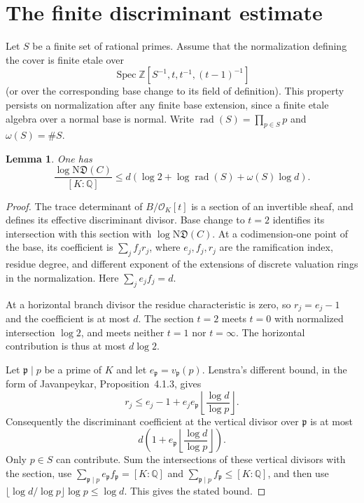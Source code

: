 \documentclass[11pt]{article}
\newtheorem{lemma}[theorem]{Lemma}
\newcommand{\Q}{\mathbb Q}
\newcommand{\Z}{\mathbb Z}
\newcommand{\OK}{\mathcal O_K}
\begin{document}
\section{The finite discriminant estimate}

Let $S$ be a finite set of rational primes. Assume that the
normalization defining the cover is finite etale over
\[
 \operatorname{Spec}\Z[S^{-1},t,t^{-1},(t-1)^{-1}]
\]
(or over the corresponding base change to its field of definition).
This property persists on normalization after any finite base
extension, since a finite etale algebra over a normal base is normal.
Write $\operatorname{rad}(S)=\prod_{p\in S}p$ and $\omega(S)=\#S$.

\begin{lemma}\label{lem:discriminant}
One has
\[
 \frac{\log\mathrm N\mathfrak D(C)}{[K:\Q]}
 \leq d\left(\log2+\log\operatorname{rad}(S)
              +\omega(S)\log d\right).
\]
\end{lemma}

\begin{proof}
The trace determinant of $B/\OK[t]$ is a section of an invertible
sheaf, and defines its effective discriminant divisor. Base change
to $t=2$ identifies its intersection with this section with
$\log\mathrm N\mathfrak D(C)$. At a codimension-one point of the
base, its coefficient is $\sum_j f_jr_j$, where $e_j,f_j,r_j$ are
the ramification index, residue degree, and different exponent of
the extensions of discrete valuation rings in the normalization.
Here $\sum_j e_jf_j=d$.

At a horizontal branch divisor the residue characteristic is zero,
so $r_j=e_j-1$ and the coefficient is at most $d$. The section
$t=2$ meets $t=0$ with normalized intersection $\log2$, and meets
neither $t=1$ nor $t=\infty$. The horizontal contribution is thus
at most $d\log2$.

Let $\mathfrak p\mid p$ be a prime of $K$ and let
$e_{\mathfrak p}=v_{\mathfrak p}(p)$. Lenstra's different bound,
in the form of Javanpeykar, Proposition~4.1.3, gives
\[
 r_j\leq e_j-1+e_j e_{\mathfrak p}
                 \left\lfloor\frac{\log d}{\log p}\right\rfloor.
\]
Consequently the discriminant coefficient at the vertical divisor
over $\mathfrak p$ is at most
\[
 d\left(1+e_{\mathfrak p}
                 \left\lfloor\frac{\log d}{\log p}\right\rfloor\right).
\]
Only $p\in S$ can contribute. Sum the intersections of these
vertical divisors with the section, use
$\sum_{\mathfrak p\mid p}e_{\mathfrak p}f_{\mathfrak p}=[K:\Q]$
and $\sum_{\mathfrak p\mid p}f_{\mathfrak p}\leq[K:\Q]$, and then
use $\lfloor\log d/\log p\rfloor\log p\leq\log d$. This gives
the stated bound.
\end{proof}
\end{document}
